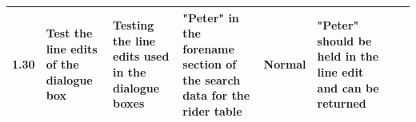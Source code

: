 \begin{landscape}
\begin{center}
\begin{longtable}{|p{1.5cm}|p{2.5cm}|p{2.5cm}|p{2cm}|p{2cm}|p{2cm}|p{2cm}|p{2cm}|}
        1.30 & Test the line edits of the dialogue box & Testing the line edits used in the dialogue boxes & "Peter" in the forename section of the search data for the rider table & Normal & "Peter" should be held in the line edit and can be returned & & \\ \hline 
    \end{longtable}
\end{center}
\end{landscape}
